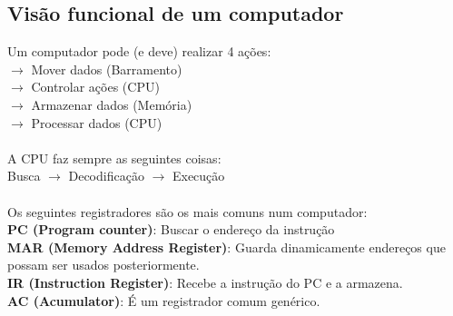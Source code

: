 \documentclass[12pt]{article}
\begin{document}
    \subsection{Visão funcional de um computador}
    Um computador pode (e deve) realizar 4 ações: 
    \\$\rightarrow$ Mover dados (Barramento)
    \\$\rightarrow$ Controlar ações (CPU)
    \\$\rightarrow$ Armazenar dados (Memória)
    \\$\rightarrow$ Processar dados (CPU)
    \\~\\A CPU faz sempre as seguintes coisas:  
    \\ Busca $\rightarrow$ Decodificação $\rightarrow$ Execução
    \\~\\Os seguintes registradores são os mais comuns num computador:
    \\\textbf{PC (Program counter)}: Buscar o endereço da instrução
    \\\textbf{MAR (Memory Address Register)}: Guarda dinamicamente endereços que possam ser usados posteriormente.
    \\\textbf{IR (Instruction Register)}: Recebe a instrução do PC e a armazena.
    \\\textbf{AC (Acumulator)}: É um registrador comum genérico.
    

\end{document}
